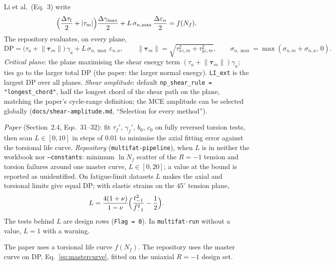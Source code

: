  Li et al.\ (Eq.~3) write
\begin{equation}
\Bigl(\frac{\Delta\tau_t}{2}+\lvert\tau_m\rvert\Bigr)\frac{\Delta\gamma_{\max}}{2}
 + L\,\sigma_{n,\max}\,\frac{\Delta\varepsilon_n}{2} = f(N_f) .
\label{eq:li-main}
\end{equation}
The repository evaluates, on every plane,
\begin{equation}
\mathrm{DP} = \bigl(\tau_a + \lVert\boldsymbol\tau_m\rVert\bigr)\,\gamma_a
 + L\,\sigma_{n,\max}\,\varepsilon_{n,a},\qquad
\lVert\boldsymbol\tau_m\rVert = \sqrt{\tau_{xz,m}^2+\tau_{yz,m}^2},\qquad
\sigma_{n,\max} = \max(\sigma_{n,m}+\sigma_{n,a},\,0) .
\label{eq:li-plane}
\end{equation}
\emph{Critical plane}: the plane maximising the shear energy term
$(\tau_a+\lVert\boldsymbol\tau_m\rVert)\gamma_a$; ties go to the larger total DP (the paper: the
larger normal energy). \texttt{LI\_ext} is the largest DP over all planes. \emph{Shear amplitude}:
default \texttt{np\_shear\_rule = "longest\_chord"}, half the longest chord of the shear path on the
plane, matching the paper's cycle-range definition; the MCE amplitude can be selected globally
(\texttt{docs/shear-amplitude.md}, ``Selection for every method'').

 \emph{Paper} (Section~2.4, Eqs.~31--32): fit
$\tau_f'$, $\gamma_f'$, $b_0$, $c_0$ on fully reversed torsion tests, then scan $L\in[0,10]$ in steps
of 0.01 to minimise the axial fitting error against the torsional life curve. \emph{Repository}
(\texttt{multifat-pipeline}), when $L$ is in neither the workbook nor \texttt{--constants}: minimum
$\ln N_f$ scatter of the $R=-1$ tension and torsion failures around one master curve,
$L\in[0,20]$; a value at the bound is reported as unidentified. On fatigue-limit datasets $L$ makes
the axial and torsional limits give equal DP; with elastic strains on the $45^\circ$ tension plane,
\begin{equation}
L = \frac{4(1+\nu)}{1-\nu}\Bigl(\frac{t_{-1}^2}{f_{-1}^2}-\frac12\Bigr) .
\label{eq:li-limit}
\end{equation}
The tests behind $L$ are design rows (\texttt{Flag = 0}). In \texttt{multifat-run} without a value,
$L=1$ with a warning.

 The paper uses a torsional life curve $f(N_f)$. The repository uses the master curve on
DP, Eq.~\eqref{eq:mastercurve}, fitted on the uniaxial $R=-1$ design set.

